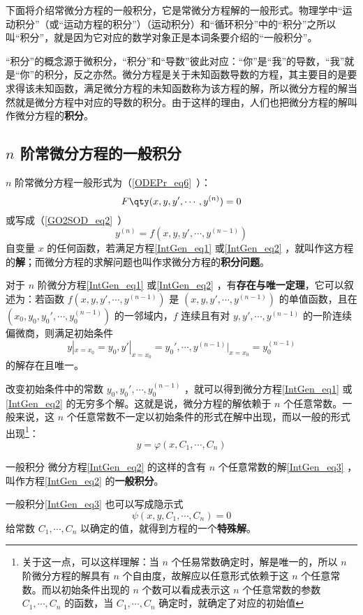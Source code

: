 下面将介绍常微分方程的一般积分，它是常微分方程解的一般形式。物理学中“运动积分”（或“运动方程的积分”）（运动积分）和“循环积分”中的“积分”之所以叫“积分”，就是因为它对应的数学对象正是本词条要介绍的“一般积分”。

“积分”的概念源于微积分，“积分”和“导数”彼此对应：“你”是“我”的导数，“我”就是“你”的积分，反之亦然。微分方程是关于未知函数导数的方程，其主要目的是要求得该未知函数，满足微分方程的未知函数称为该方程的解，所以微分方程的解当然就是微分方程中对应的导数的积分。由于这样的理由，人们也把微分方程的解叫作微分方程的\textbf{积分}。
\subsection{$n$ 阶常微分方程的一般积分}
$n$ 阶常微分方程一般形式为（\autoref{ODEPr_eq6}~）：
\begin{equation}\label{IntGen_eq1}
F \qty(x,y,y',\cdots,y^{(n)}) =0
\end{equation}
或写成（\autoref{GO2SOD_eq2}~）
\begin{equation}\label{IntGen_eq2}
y^{(n)}=f(x,y,y',\cdots,y^{(n-1)})
\end{equation}
自变量 $x$ 的任何函数，若满足方程\autoref{IntGen_eq1} 或\autoref{IntGen_eq2} ，就叫作这方程的\textbf{解}；而微分方程的求解问题也叫作求微分方程的\textbf{积分问题}。

对于 $n$ 阶微分方程\autoref{IntGen_eq1} 或\autoref{IntGen_eq2} ，有\textbf{存在与唯一定理}，它可以叙述为：若函数 $f(x,y,y',\cdots,y^{(n-1)})$ 是 $(x,y,y',\cdots,y^{(n-1)})$ 的单值函数，且在 $(x_0,y_0,y_0',\cdots,y_0^{(n-1)})$ 的一邻域内，$f$ 连续且有对 $y,y',\cdots,y^{(n-1)}$ 的一阶连续偏微商，则满足初始条件
\begin{equation}\label{IntGen_eq5}
y|_{x=x_0}=y_0,y'|_{x=x_0}=y_0',\cdots,y^{(n-1)}|_{x=x_0}=y_0^{(n-1)}
\end{equation}
的解存在且唯一。

改变初始条件中的常数 $y_0,y_0',\cdots,y_0^{(n-1)}$ ，就可以得到微分方程\autoref{IntGen_eq1} 或\autoref{IntGen_eq2} 的无穷多个解。这就是说，微分方程的解依赖于 $n$ 个任意常数。一般来说，这 $n$ 个任意常数不一定以初始条件的形式在解中出现，而以一般的形式出现\footnote{关于这一点，可以这样理解：当 $n$ 个任易常数确定时，解是唯一的，所以 $n$ 阶微分方程的解具有 $n$ 个自由度，故解应以任意形式依赖于这 $n$ 个任意常数。而以初始条件出现的 $n$ 个数可以看成表示这 $n$ 个任意常数的参数 $C_1,\cdots,C_n$ 的函数，当 $C_1,\cdots,C_n$ 确定时，就确定了对应的初始值}：
\begin{equation}\label{IntGen_eq3}
y=\varphi(x,C_1,\cdots,C_n)
\end{equation}
\begin{definition}{一般积分}
微分方程\autoref{IntGen_eq2} 的这样的含有 $n$ 个任意常数的解\autoref{IntGen_eq3} ，叫作方程\autoref{IntGen_eq2} 的\textbf{一般积分}。
\end{definition}
一般积分\autoref{IntGen_eq3} 也可以写成隐示式
\begin{equation}\label{IntGen_eq4}
\psi(x,y,C_1,\cdots,C_n)=0
\end{equation}
给常数 $C_1,\cdots,C_n$ 以确定的值，就得到方程的一个\textbf{特殊解}。

